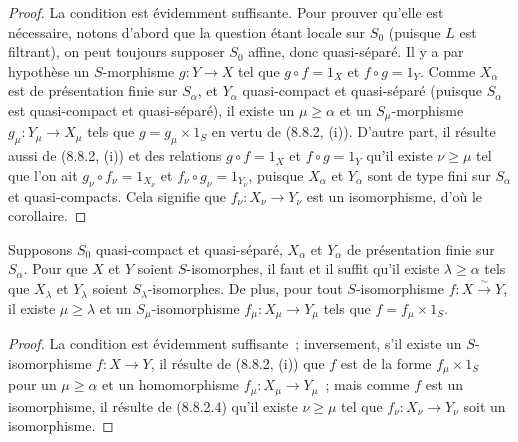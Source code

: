 \begin{proof}
La condition est évidemment suffisante. Pour prouver qu'elle est nécessaire,
notons d'abord que la question étant locale sur $S_0$ (puisque $L$ est
filtrant), on peut toujours supposer $S_0$ affine, donc quasi-séparé. Il y a
par hypothèse un $S$-morphisme $g:Y\to X$ tel que $g\circ f=1_X$ et
$f\circ g=1_Y$. Comme $X_\alpha$ est de présentation finie sur $S_\alpha$,
et $Y_\alpha$ quasi-compact et quasi-séparé (puisque $S_\alpha$ est
quasi-compact et quasi-séparé), il existe un $\mu\geq\alpha$ et un
$S_\mu$-morphisme $g_\mu:Y_\mu\to X_\mu$ tels que
$g=g_\mu\times1_S$ en vertu de (8.8.2, (i)). D'autre part, il résulte aussi de
(8.8.2, (i)) et des relations $g\circ f=1_X$ et $f\circ g=1_Y$ qu'il existe
$\nu\geq\mu$ tel que l'on ait $g_\nu\circ f_\nu=1_{X_\nu}$ et
$f_\nu\circ g_\nu=1_{Y_\nu}$, puisque $X_\alpha$ et $Y_\alpha$ sont de type
fini sur $S_\alpha$ et quasi-compacts. Cela signifie que
$f_\nu:X_\nu\to Y_\nu$ est un isomorphisme, d'où le corollaire.
\end{proof}

\begin{corollary}[8.8.2.5]
\label{IV.8.8.2.5-fr}
Supposons $S_0$ quasi-compact et quasi-séparé, $X_\alpha$ et $Y_\alpha$ de
présentation finie sur $S_\alpha$. Pour que $X$ et $Y$ soient
$S$-isomorphes, il faut et il suffit qu'il existe $\lambda\geq\alpha$ tels que
$X_\lambda$ et $Y_\lambda$ soient $S_\lambda$-isomorphes. De plus, pour tout
$S$-isomorphisme $f:X\xrightarrow{\sim}Y$, il existe $\mu\geq\lambda$ et un
$S_\mu$-isomorphisme $f_\mu:X_\mu\to Y_\mu$ tels que
$f=f_\mu\times1_S$.
\end{corollary}

\begin{proof}
La condition est évidemment suffisante~; inversement, s'il existe un
$S$-isomorphisme $f:X\to Y$, il résulte de (8.8.2, (i)) que $f$ est de la
forme $f_\mu\times1_S$ pour un $\mu\geq\alpha$ et un homomorphisme
$f_\mu:X_\mu\to Y_\mu$~; mais comme $f$ est un isomorphisme, il résulte de
(8.8.2.4) qu'il existe $\nu\geq\mu$ tel que
$f_\nu:X_\nu\to Y_\nu$ soit un isomorphisme.
\end{proof}

